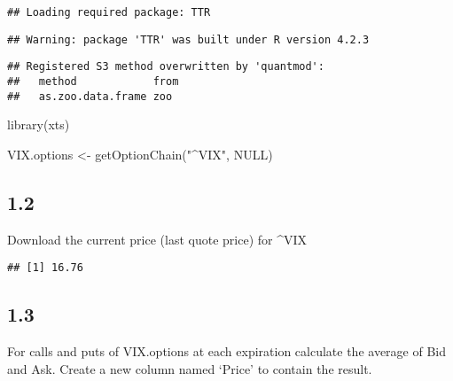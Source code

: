 \documentclass[
]{article}
\newenvironment{Shaded}{\begin{snugshade}}{\end{snugshade}}
\newcommand{\ConstantTok}[1]{\textcolor[rgb]{0.00,0.00,0.00}{#1}}
\newcommand{\FunctionTok}[1]{\textcolor[rgb]{0.00,0.00,0.00}{#1}}
\newcommand{\NormalTok}[1]{#1}
\newcommand{\OtherTok}[1]{\textcolor[rgb]{0.56,0.35,0.01}{#1}}
\newcommand{\SpecialCharTok}[1]{\textcolor[rgb]{0.00,0.00,0.00}{#1}}
\newcommand{\StringTok}[1]{\textcolor[rgb]{0.31,0.60,0.02}{#1}}
\begin{document}
\begin{verbatim}
## Loading required package: TTR
\end{verbatim}

\begin{verbatim}
## Warning: package 'TTR' was built under R version 4.2.3
\end{verbatim}

\begin{verbatim}
## Registered S3 method overwritten by 'quantmod':
##   method            from
##   as.zoo.data.frame zoo
\end{verbatim}

\begin{Shaded}
\begin{Highlighting}[]
\FunctionTok{library}\NormalTok{(xts)}

\NormalTok{VIX.options }\OtherTok{\textless{}{-}} \FunctionTok{getOptionChain}\NormalTok{(}\StringTok{"\^{}VIX"}\NormalTok{, }\ConstantTok{NULL}\NormalTok{)}
\end{Highlighting}
\end{Shaded}

\hypertarget{section-1}{%
\subsection{1.2}\label{section-1}}

Download the current price (last quote price) for \^{}VIX

\begin{Shaded}
\end{Shaded}

\begin{verbatim}
## [1] 16.76
\end{verbatim}

\hypertarget{section-2}{%
\subsection{1.3}\label{section-2}}

For calls and puts of VIX.options at each expiration calculate the
average of Bid and Ask. Create a new column named `Price' to contain the
result.
\end{document}
